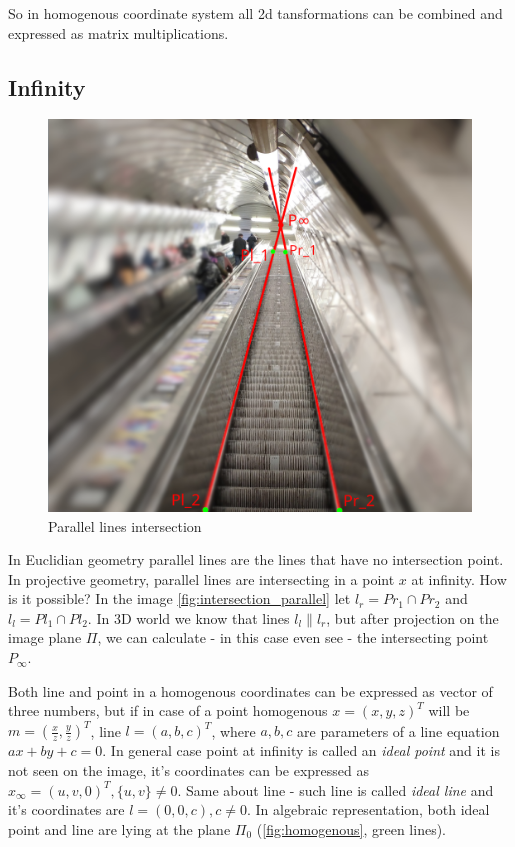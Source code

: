 So in homogenous coordinate system all 2d tansformations can be combined and expressed as matrix multiplications.

\subsection{Infinity}
\begin{figure}[h]
    \centering
    \includegraphics[width=1\textwidth]{graphics/parallel_intersection.jpg}
    \caption{Parallel lines intersection}
    \label{fig:intersection_parallel}
\end{figure}

In Euclidian geometry parallel lines are the lines that have no intersection point. 
In projective geometry, parallel lines are intersecting in a point $x$ at infinity. 
How is it possible? 
In the image \autoref{fig:intersection_parallel} let $l_r = Pr_1 \cap Pr_2 $ and $l_l = Pl_1 \cap Pl_2$. 
In 3D world we know that lines $l_l \parallel l_r$, but after projection on the image plane $\Pi$, we can calculate - in this case even see - the intersecting point $P_{\infty}$. 

Both line and point in a homogenous coordinates can be expressed as vector of three numbers, but if in case of a point homogenous $x = (x, y, z)^T$ will be $m = (\frac{x}{z}, \frac{y}{z})^T$, line $l = (a, b, c)^T$, where $a, b, c$ are parameters of a line equation $ax + by + c = 0$. 
In general case point at infinity is called an \textit{ideal point} and it is not seen on the image, it's coordinates can be expressed as $x_{\infty} = (u, v, 0)^T, \{u, v\} \neq 0$. Same about line - such line is called \textit{ideal line} and it's coordinates are $l = (0, 0, c), c \neq 0$. In algebraic representation, both ideal point and line are lying at the plane $\Pi_0$ (\autoref{fig:homogenous}, green lines).

